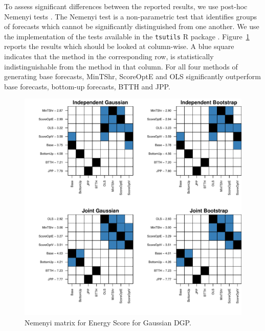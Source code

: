 \documentclass[a4paper,12pt]{article}
\theoremstyle{definition}
\begin{document}
To assess significant differences between the reported results, we use post-hoc Nemenyi tests \citep{HolEtAl2013}. The Nemenyi test is a non-parametric test that identifies groups of forecasts which cannot be significantly distinguished from one another. We use the implementation of the tests available in the \verb|tsutils| R package \citep{tsutilspackage}. Figure~\ref{fig:gse} reports the results which should be looked at column-wise. A blue square indicates that the method in the corresponding row, is statistically indistinguishable from the method in that column. For all four methods of generating base forecasts, MinTShr, ScoreOptE and OLS significantly outperform base forecasts, bottom-up forecasts, BTTH and JPP.

\begin{figure}[!htb]
	\centering
	\includegraphics[height=.5\textheight]{gse.pdf}
	\caption{Nemenyi matrix for Energy Score for Gaussian DGP.}
	\label{fig:gse}
\end{figure}

\end{document}
